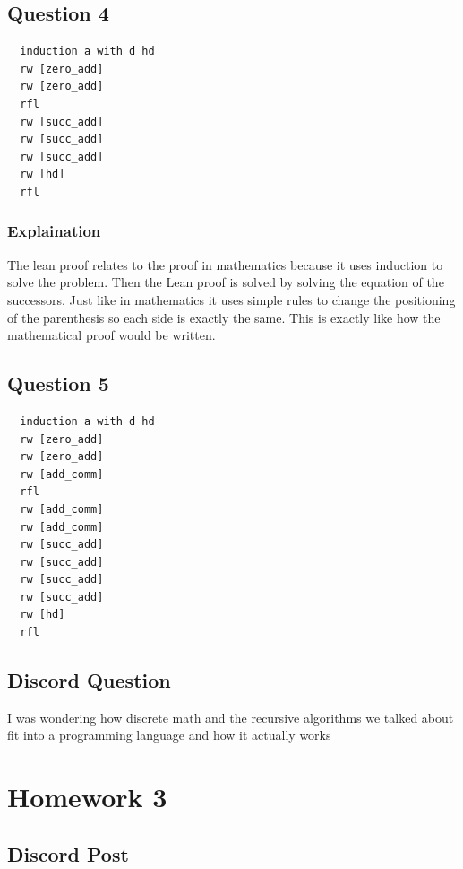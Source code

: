 \documentclass{article}
\theoremstyle{plain}
\theoremstyle{definition}
\theoremstyle{remark}
\begin{document}
\subsection{Question 4}

\begin{lstlisting}
  induction a with d hd
  rw [zero_add]
  rw [zero_add]
  rfl
  rw [succ_add]
  rw [succ_add]
  rw [succ_add]
  rw [hd]
  rfl
\end{lstlisting}

\subsubsection{Explaination}

The lean proof relates to the proof in mathematics because it uses induction to solve the problem. Then the Lean proof is solved by solving the equation of the successors. Just like in mathematics it uses simple rules to change the positioning of the parenthesis so each side is exactly the same. This is exactly like how the mathematical proof would be written.

\subsection{Question 5}

\begin{lstlisting}
  induction a with d hd
  rw [zero_add]
  rw [zero_add]
  rw [add_comm]
  rfl
  rw [add_comm]
  rw [add_comm]
  rw [succ_add]
  rw [succ_add]
  rw [succ_add]
  rw [succ_add]
  rw [hd]
  rfl
\end{lstlisting}

\subsection{Discord Question}

I was wondering how discrete math and the recursive algorithms we talked about fit into a programming language and how it actually works

\section{Homework 3}\label{homework3}

\subsection{Discord Post}
\end{document}
